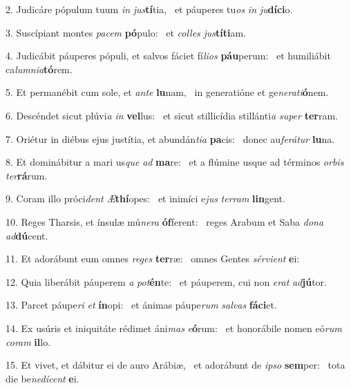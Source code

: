 2. Judicáre pópulum tuum \textit{in} \textit{jus}\textbf{tí}tia, \ast\  et páuperes tu\textit{os} \textit{in} \textit{ju}\textbf{dí}\textbf{ci}o.\

3. Suscípiant montes \textit{pa}\textit{cem} \textbf{pó}pulo: \ast\  et \textit{col}\textit{les} \textit{jus}\textbf{tí}\textbf{ti}am.\

4. Judicábit páuperes pópuli, et salvos fáciet fí\textit{li}\textit{os} \textbf{páu}perum: \ast\  et humiliábit ca\textit{lum}\textit{ni}\textit{a}\textbf{tó}rem.\

5. Et permanébit cum sole, et \textit{an}\textit{te} \textbf{lu}nam, \ast\  in generatióne et ge\textit{ne}\textit{ra}\textit{ti}\textbf{ó}nem.\

6. Descéndet sicut plúvi\textit{a} \textit{in} \textbf{vel}lus: \ast\  et sicut stillicídia stillánti\textit{a} \textit{su}\textit{per} \textbf{ter}ram.\

7. Oriétur in diébus ejus justítia, et abundán\textit{ti}\textit{a} \textbf{pa}cis: \ast\  donec au\textit{fe}\textit{rá}\textit{tur} \textbf{lu}na.\

8. Et dominábitur a mari us\textit{que} \textit{ad} \textbf{ma}re: \ast\  et a flúmine usque ad términos \textit{or}\textit{bis} \textit{ter}\textbf{rá}rum.\

9. Coram illo próci\textit{dent} \textit{Æ}\textbf{thí}opes: \ast\  et inimíci e\textit{jus} \textit{ter}\textit{ram} \textbf{lin}gent.\

10. Reges Tharsis, et ínsulæ mú\textit{ne}\textit{ra} \textbf{óf}ferent: \ast\  reges Arabum et Saba \textit{do}\textit{na} \textit{ad}\textbf{dú}cent.\

11. Et adorábunt eum omnes \textit{re}\textit{ges} \textbf{ter}ræ: \ast\  omnes Gentes \textit{sér}\textit{vi}\textit{ent} \textbf{e}i:\

12. Quia liberábit páuperem \textit{a} \textit{pot}\textbf{én}te: \ast\  et páuperem, cui non \textit{e}\textit{rat} \textit{ad}\textbf{jú}tor.\

13. Parcet páupe\textit{ri} \textit{et} \textbf{ín}opi: \ast\  et ánimas páupe\textit{rum} \textit{sal}\textit{vas} \textbf{fá}\textbf{ci}et.\

14. Ex usúris et iniquitáte rédimet áni\textit{mas} \textit{e}\textbf{ó}rum: \ast\  et honorábile nomen eó\textit{rum} \textit{co}\textit{ram} \textbf{il}lo.\

15. Et vivet, et dábitur ei de auro Arábiæ, \dag\  et adorábunt de \textit{ip}\textit{so} \textbf{sem}per: \ast\  tota die be\textit{ne}\textit{dí}\textit{cent} \textbf{e}i.\

